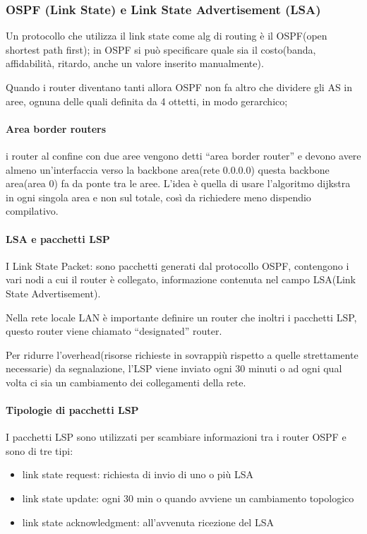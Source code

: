 \subsubsection{OSPF (Link State) e Link State Advertisement (LSA)}

Un protocollo che utilizza il link state come alg di routing è il OSPF(open shortest path first);
in OSPF si può specificare quale sia il costo(banda, affidabilità, ritardo, anche un valore inserito manualmente).

Quando i router diventano tanti allora OSPF non fa altro che dividere gli AS in aree, ognuna delle quali definita da 4 ottetti, in modo gerarchico;
\paragraph{Area border routers}
i router al confine con due aree vengono detti “area border router” e devono avere almeno un'interfaccia verso la backbone area(rete 0.0.0.0)
questa backbone area(area 0) fa da ponte tra le aree.
L'idea è quella di usare l'algoritmo dijkstra in ogni singola area e non sul totale, così da richiedere meno dispendio compilativo.

\paragraph{LSA e pacchetti LSP}
I Link State Packet: sono pacchetti generati dal protocollo OSPF, contengono i vari nodi a cui il router è collegato, informazione contenuta nel campo LSA(Link State Advertisement).

Nella rete locale LAN è importante definire un router che inoltri i pacchetti LSP, questo router viene chiamato “designated” router.

Per ridurre l'overhead(risorse richieste in sovrappiù rispetto a quelle strettamente necessarie) da segnalazione, l'LSP viene inviato ogni 30 minuti o ad ogni qual volta ci sia un cambiamento dei collegamenti della rete.

\paragraph{Tipologie di pacchetti LSP}
I pacchetti LSP sono utilizzati per scambiare informazioni tra i router OSPF e sono di tre tipi:
\begin{itemize}
    \item link state request: richiesta di invio di uno o più LSA
    \item link state update: ogni 30 min o quando avviene un cambiamento topologico
    \item link state acknowledgment: all'avvenuta ricezione del LSA
\end{itemize}
